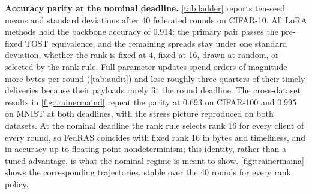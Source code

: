 \documentclass[a4paper,fleqn]{cas-dc}
\begin{document}
\textbf{Accuracy parity at the nominal deadline.} \cref{tab:ladder} reports ten-seed means and standard deviations after 40 federated rounds on CIFAR-10. All LoRA methods hold the backbone accuracy of 0.914: the primary pair passes the pre-fixed TOST equivalence, and the remaining spreads stay under one standard deviation, whether the rank is fixed at 4, fixed at 16, drawn at random, or selected by the rank rule. Full-parameter updates spend orders of magnitude more bytes per round (\cref{tab:audit}) and lose roughly three quarters of their timely deliveries because their payloads rarely fit the round deadline. The cross-dataset results in \cref{fig:trainermaind} repeat the parity at 0.693 on CIFAR-100 and 0.995 on MNIST at both deadlines, with the stress picture reproduced on both datasets. At the nominal deadline the rank rule selects rank 16 for every client of every round, so FedRAS coincides with fixed rank 16 in bytes and timeliness, and in accuracy up to floating-point nondeterminism; this identity, rather than a tuned advantage, is what the nominal regime is meant to show. \cref{fig:trainermaina} shows the corresponding trajectories, stable over the 40 rounds for every rank policy.
\par
\end{document}
